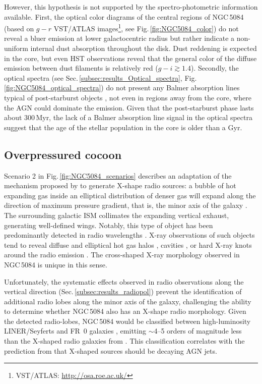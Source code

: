 \documentclass[modern]{CORE-AAS/aastex631}
\begin{document}
However, this hypothesis is not supported by the spectro-photometric information available. First, the optical color diagrams of the central regions of NGC\,5084 (based on $g-r$ VST/ATLAS images\footnote{VST/ATLAS: \url{http://osa.roe.ac.uk/}}, see Fig.\,\ref{fig:NGC5084_color}) do not reveal a bluer emission at lower galactocentric radius but rather indicate a non-uniform internal dust absorption throughout the disk. Dust reddening is expected in the core, but even HST observations reveal that the general color of the diffuse emission between dust filaments is relatively red ($g-i\gtrsim1.4$).
Secondly, the optical spectra (see Sec.\,\ref{subsec:results_Optical_spectra}, Fig.\,\ref{fig:NGC5084_optical_spectra}) do not present any Balmer absorption lines typical of post-starburst objects \citep[also called E+A or K+A galaxies,][]{dressler+1983apj270_7}, not even in regions away from the core, where the AGN could dominate the emission. Given that the post-starburst phase lasts about 300\,Myr, the lack of a Balmer absorption line signal in the optical spectra suggest that the age of the stellar population in the core is older than a Gyr. 


\subsection{Overpressured cocoon}
\label{subsec:discussion_cocoon}

Scenario 2 in Fig.\,\ref{fig:NGC5084_scenarios} describes an adaptation of the mechanism proposed by \citet{capetti+2002aap394_39} to generate X-shape radio sources: a bubble of hot expanding gas inside an elliptical distribution of denser gas will expand along the direction of maximum pressure gradient, that is, the minor axis of the galaxy  \citep{blandford+1974mnras169_395}. The surrounding galactic ISM collimates the expanding vertical exhaust, generating well-defined wings. Notably, this type of object has been predominantly detected in radio wavelengths \citep[X-shaped radio galaxies,][]{hodgeskluck2011thesis, giri+2024sci11_1371101}.  X-ray observations of such objects tend to reveal diffuse and elliptical hot gas halos \citep{hodgeskluck+2010apj710_1205}, cavities \citep{hodgeskluck+2010apj717_37}, or hard X-ray knots around the radio emission \citep{hodgeskluck+2012apj746_167}. The cross-shaped X-ray morphology observed in NGC\,5084 is unique in this sense. 

Unfortunately, the systematic effects observed in radio observations along the vertical direction (Sec.\,\ref{subsec:results_radiopol}) prevent the identification of additional radio lobes along the minor axis of the galaxy, challenging the ability to determine whether NGC\,5084 also has an X-shape radio morphology. Given the detected radio-lobes, NGC\,5084 would be classified between high-luminosity LINER/Seyferts and FR~0 galaxies \citep[see Table \ref{tab:Radio_Lobes},][]{baldi2023aap31_3}, emitting $\sim$4--5 orders of magnitude less than the X-shaped radio galaxies from \citet{cheung+2009apj181_548}. This classification correlates with the prediction from \citet{hodgeskluck2011thesis} that X-shaped sources should be decaying AGN jets. 
\end{document}

